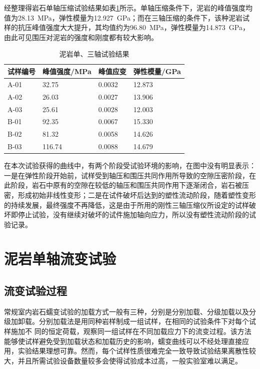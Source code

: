 经整理得岩石单轴压缩试验结果如表\ref{tab:泥岩单、三轴试验结果}所示。单轴压缩条件下，泥岩的峰值强度均值为\SI{28.13}{MPa}，弹性模量为\SI{12.927}{GPa}；而在三轴压缩的条件下，该种泥岩试样的抗压峰值强度大大提升，其均值约为\SI{96.80}{MPa}，弹性模量为\SI{14.873}{GPa}，由此可见围压对泥岩的强度和刚度都有较大影响。
\begin{table}[ht!]\small
    \centering
    \begin{tabular}{p{3cm}<{\centering} p{3cm}<{\centering} p{3cm}<{\centering} p{3cm}<{\centering}}
        \toprule
        试样编号  & 峰值强度/MPa  &  峰值应变   &  弹性模量/GPa\\
        \midrule
        A-01        & 32.75  &   0.0032  &  12.873   \\ 
        A-02        & 26.03 &   0.0027  &  13.906   \\ 
        A-03        & 25.61  &   0.0028  &  12.003  \\ 
        \midrule
        B-01        & 92.35  &   0.0067  &  15.330   \\ 
        B-02        & 81.32 &   0.0058 &  14.626   \\ 
        B-03        & 116.74 &   0.0088  &  14.679 \\ 
        \bottomrule
    \end{tabular}
    \caption{泥岩单、三轴试验结果}
    \label{tab:泥岩单、三轴试验结果}
\end{table}

    
在本次试验获得的曲线中，有两个阶段受试验环境的影响，在图中没有明显表示：一是在弹性阶段开始前，试样受到轴压和围压共同作用所导致的空隙压密阶段，在此阶段，岩石中原有的空隙在较低的轴压和围压共同作用下逐渐闭合，岩石被压密，形成初始非线性变形；二是在试件破坏后达到的塑性流动阶段，随着塑性变形的持续发展，最终强度不再降低，这是由于所用的刚性三轴压缩仪所设定的试样破坏即停止试验，没有继续对破坏的试件施加轴向应力，所以没有塑性流动阶段的试验记录。


\section{泥岩单轴流变试验}\label{section:泥岩单轴流变试验}
\subsection{流变试验过程}
常规室内岩石蠕变试验的加载方式一般有三种，分别是分别加载、分级加载以及分级加卸载。分别加载法是用同种岩样制成一组试样，在相同的试验条件下对每个试样施加不
同的恒定荷载，观察同一组试样在不同加载应力下的流变过程。该方法能够使试样避免受到加载状态和加载历史的影响，蠕变曲线可以不经处理直接应用，实验结果理想可靠。然而，每个试样性质很难完全一致导致试验结果离散性较大，并且所需试验设备数量较多会使得试验成本过高，一般实验室难以满足。

